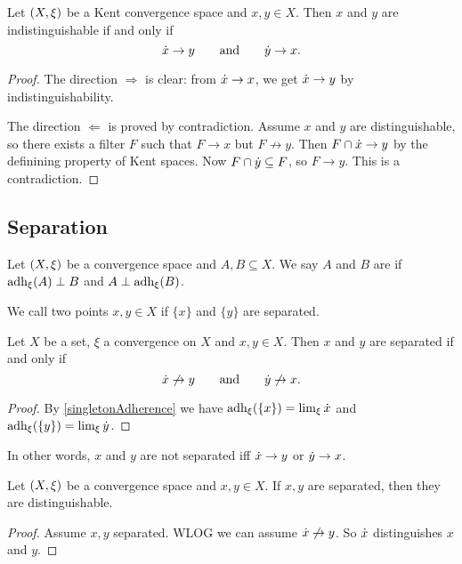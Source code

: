 \begin{proposition} \label{distinguishabilityPrincipalUltrafilters}
Let $\left( X,\xi \right)$ be a Kent convergence space and $x,y\in X$. Then $x$ and $y$ are indistinguishable \textup{if and only if}
\[ \dot{x} \to y \qquad \text{and}\qquad \dot{y}\to x. \]
\end{proposition}
\begin{proof}
The direction $\Rightarrow$ is clear: from $\dot{x} \to x$, we get $\dot{x}\to y$ by indistinguishability.

The direction $\Leftarrow$ is proved by contradiction. Assume $x$ and $y$ are distinguishable, so there exists a filter $F$ such that $F\to x$ but $F\not\to y$. Then $F\cap \dot{x} \to y$ by the definining property of Kent spaces. Now $F\cap \dot{y} \subseteq F$, so $F\to y$. This is a contradiction.
\end{proof}


\subsection{Separation}
\begin{definition}
Let $\left( X,\xi \right)$ be a convergence space and $A,B\subseteq X$. We say $A$ and $B$ are  if $\operatorname{adh}_\xi(A) \perp B$ and $A\perp \operatorname{adh}_\xi(B)$.

We call two points $x,y\in X$  if $\{x\}$ and $\{y\}$ are separated.
\end{definition}

\begin{proposition} \label{separatednessPrincipalUltrafilters}
Let $X$ be a set, $\xi$ a convergence on $X$ and $x,y\in X$. Then $x$ and $y$ are separated \textup{if and only if}
\[ \dot{x} \not\to y \qquad \text{and}\qquad \dot{y}\not\to x. \]
\end{proposition}
\begin{proof}
By \ref{singletonAdherence} we have $\operatorname{adh}_\xi(\{x\}) = \lim_\xi\dot{x}$ and $\operatorname{adh}_\xi(\{y\}) = \lim_\xi\dot{y}$.
\end{proof}
In other words, $x$ and $y$ are not separated iff $\dot{x} \to y$ or $\dot{y} \to x$.

\begin{lemma} \label{separatedDistinguishable}
Let $\left( X,\xi \right)$ be a convergence space and $x,y\in X$. If $x,y$ are separated, then they are distinguishable.
\end{lemma}
\begin{proof}
Assume $x,y$ separated. WLOG we can assume $\dot{x} \not\to y$. So $\dot{x}$ distinguishes $x$ and $y$.
\end{proof}

